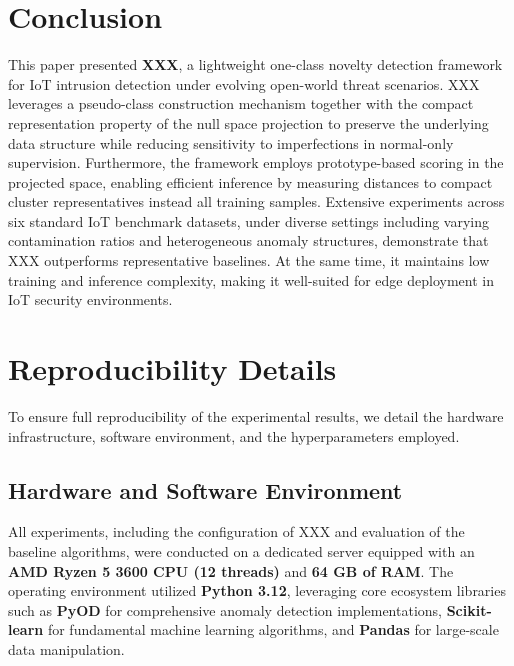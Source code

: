 \documentclass[final,twocolumn,10pt]{elsarticle}
\begin{document}
\newpage
\section{Conclusion}
This paper presented \textbf{XXX}, a lightweight one-class novelty detection framework for IoT intrusion detection under evolving open-world threat scenarios. XXX leverages a pseudo-class construction mechanism together with the compact representation property of the null space projection to preserve the underlying data structure while reducing sensitivity to imperfections in normal-only supervision. Furthermore, the framework employs prototype-based scoring in the projected space, enabling efficient inference by measuring distances to compact cluster representatives instead all training samples. Extensive experiments across six standard IoT benchmark datasets, under diverse settings including varying contamination ratios and heterogeneous anomaly structures, demonstrate that XXX outperforms representative baselines. At the same time, it maintains low training and inference complexity, making it well-suited for edge deployment in IoT security environments.






\newpage
\appendix
\onecolumn

\setcounter{table}{0}
\renewcommand{\thetable}{A.\arabic{table}}
\setcounter{figure}{0}
\renewcommand{\thefigure}{A.\arabic{figure}}

\section{Reproducibility Details}
\label{ap1:reproducibility}

To ensure full reproducibility of the experimental results, we detail the hardware infrastructure, software environment, and the hyperparameters employed.

\subsection{Hardware and Software Environment}
All experiments, including the configuration of XXX and evaluation of the baseline algorithms, were conducted on a dedicated server equipped with an \textbf{AMD Ryzen 5 3600 CPU (12 threads)} and \textbf{64 GB of RAM}. The operating environment utilized \textbf{Python 3.12}, leveraging core ecosystem libraries such as \textbf{PyOD} for comprehensive anomaly detection implementations, \textbf{Scikit-learn} for fundamental machine learning algorithms, and \textbf{Pandas} for large-scale data manipulation.
\end{document}
